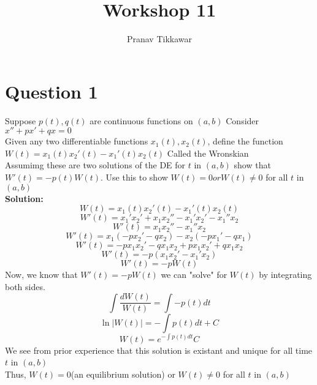 \documentclass{article}
\author{Pranav Tikkawar}
\title{Workshop 11}
\begin{document}
\maketitle
\section{Question 1}
Suppose $p(t), q(t)$ are continuous functions on $(a,b)$ Consider $x'' + px' + qx = 0$\\
Given any two differentiable functions $x_1(t), x_2(t)$, define the function $W(t) = x_1(t)x_2'(t) - x_1'(t)x_2(t)$ Called the Wronskian \\
Assumimg these are two solutions of the DE for $t$ in $(a,b)$ show that $W'(t) = -p(t)W(t)$. Use this to show $W(t) = 0 or W(t) \neq 0$ for all $t$ in $(a,b)$\\
\textbf{Solution:}\\
$$W(t) = x_1(t)x_2'(t) - x_1'(t)x_2(t)$$
$$W'(t) = x_1' x_2' + x_1 x_2'' - x_1'x_2' - x_1''x_2$$
$$W'(t) = x_1 x_2'' - x_1''x_2$$
$$W'(t) = x_1(- px_2' - qx_2) - x_2(-px_1' - qx_1)$$
$$W'(t) = -px_1x_2' - qx_1x_2 + px_1x_2' + qx_1x_2$$
$$W'(t) = -p(x_1x_2' - x_1'x_2)$$
$$W'(t) = -pW(t)$$
Now, we know that $W'(t) = -pW(t)$ we can "solve" for $W(t)$ by integrating both sides. \\
$$\int \frac{dW(t)}{W(t)} = \int -p(t)dt$$
$$\ln|W(t)| = -\int p(t)dt + C$$
$$W(t) = e^{-\int p(t)dt}C$$
We see from prior experience that this solution is existant and unique for all time $t$ in $(a,b)$\\ Thus, $W(t) = 0$(an equilibrium solution) or $W(t) \neq 0$ for all $t$ in $(a,b)$
\end{document}
